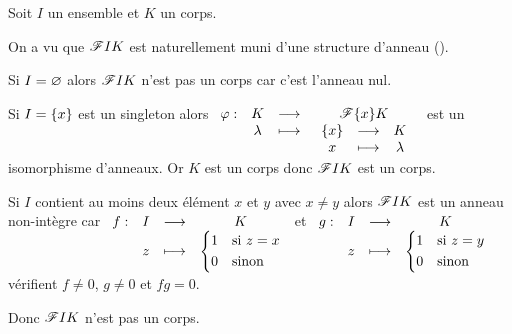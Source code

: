 \begin{ex}
Soit \(I\) un ensemble et \(K\) un corps.

On a vu que \(\mathscr{F}{I}{K}\) est naturellement muni d'une structure d'anneau (\cf {}).

Si \(I=\varnothing\) alors \(\mathscr{F}{I}{K}\) n'est pas un corps car c'est l'anneau nul.

Si \(I=\left\lbrace x\right\rbrace\) est un singleton alors \(\begin{array}[t]{cccc}\varphi : & K & \longrightarrow & \mathscr{F}{\left\lbrace x\right\rbrace}{K} \\ & \lambda & \longmapsto & \begin{array}[t]{ccc}\left\lbrace x\right\rbrace & \longrightarrow & K \\ x & \longmapsto & \lambda\end{array}\end{array}\) est un isomorphisme d'anneaux. Or \(K\) est un corps donc \(\mathscr{F}{I}{K}\) est un corps.

Si \(I\) contient au moins deux élément \(x\) et \(y\) avec \(x\not=y\) alors \(\mathscr{F}{I}{K}\) est un anneau non-intègre car \(\begin{array}[t]{cccc}f : & I & \longrightarrow & K \\ & z & \longmapsto & \begin{dcases}1&\text{si }z=x \\ 0&\text{sinon}\end{dcases}\end{array}\) et \(\begin{array}[t]{cccc}g : & I & \longrightarrow & K \\ & z & \longmapsto & \begin{dcases}1&\text{si }z=y \\ 0&\text{sinon}\end{dcases}\end{array}\) vérifient \(f\not=0\), \(g\not=0\) et \(fg=0\).

Donc \(\mathscr{F}{I}{K}\) n'est pas un corps.
\end{ex}